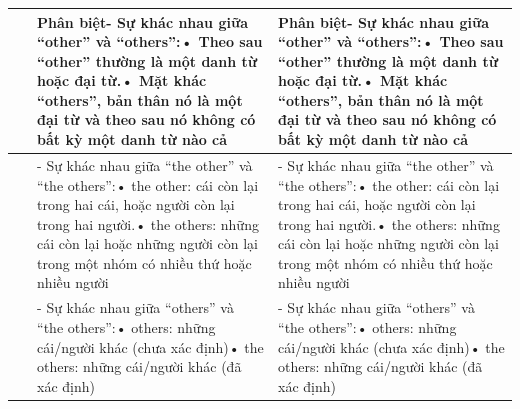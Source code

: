 \documentclass[12pt,a4paper,twoside]{article}
\newcommand{\subheading}[1]{%
    \par\vspace{10pt}%
    \noindent{\color{accentBlue}\Large\textbf{#1}}%
    \par\vspace{6pt}%
}
\begin{document}
{\begin{longtable}{|>{\raggedright\arraybackslash}p{}|>{\raggedright\arraybackslash}p{}|>{\raggedright\arraybackslash}p{}|}
\hline
~ & Phân biệt\newline - Sự khác nhau giữa “other” và “others”:\newline • Theo sau “other” thường là một danh từ hoặc đại từ.\newline • Mặt khác “others”, bản thân nó là một đại từ và theo sau nó không có bất kỳ một danh từ nào cả & Phân biệt\newline - Sự khác nhau giữa “other” và “others”:\newline • Theo sau “other” thường là một danh từ hoặc đại từ.\newline • Mặt khác “others”, bản thân nó là một đại từ và theo sau nó không có bất kỳ một danh từ nào cả \\
\hline
~ & - Sự khác nhau giữa “the other” và “the others”:\newline • the other: cái còn lại trong hai cái, hoặc người còn lại trong hai người.\newline • the others: những cái còn lại hoặc những người còn lại trong một nhóm có nhiều thứ hoặc nhiều người & - Sự khác nhau giữa “the other” và “the others”:\newline • the other: cái còn lại trong hai cái, hoặc người còn lại trong hai người.\newline • the others: những cái còn lại hoặc những người còn lại trong một nhóm có nhiều thứ hoặc nhiều người \\
\hline
~ & - Sự khác nhau giữa “others” và “the others”:\newline • others: những cái/người khác (chưa xác định)\newline • the others: những cái/người khác (đã xác định) & - Sự khác nhau giữa “others” và “the others”:\newline • others: những cái/người khác (chưa xác định)\newline • the others: những cái/người khác (đã xác định) \\
\hline
\end{longtable}
}
\subheading{2. Mạo từ}
\end{document}

